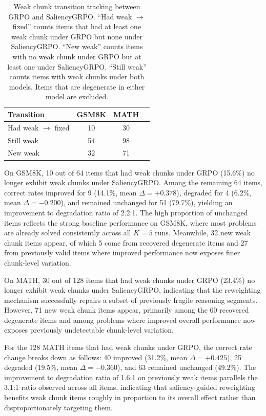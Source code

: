 \documentclass[12pt]{report}
\begin{document}
\begin{table}[htbp]
\centering
\caption{Weak chunk transition tracking between GRPO and SaliencyGRPO.  ``Had weak $\to$ fixed'' counts
items that had at least one weak chunk under GRPO but none under SaliencyGRPO.  ``New weak'' counts
items with no weak chunk under GRPO but at least one under SaliencyGRPO.  ``Still weak'' counts items
with weak chunks under both models.  Items that are degenerate in either model are excluded.}
\label{tab:weak-chunk-tracking}
\begin{tabular}{lccc}
\toprule
\textbf{Transition} & \textbf{GSM8K} & \textbf{MATH} \\
\midrule
Had weak $\to$ fixed       & 10 & 30 \\
Still weak                 & 54 & 98 \\
New weak                   & 32 & 71 \\
\bottomrule
\end{tabular}
\end{table}

On GSM8K, 10 out of 64 items that had weak chunks under GRPO (15.6\%) no longer exhibit
weak chunks under SaliencyGRPO.  Among the remaining 64 items, correct rates improved for
9 (14.1\%, mean $\Delta = +0.378$), degraded for 4 (6.2\%, mean $\Delta = -0.200$), and remained
unchanged for 51 (79.7\%), yielding an improvement to degradation ratio of 2.2:1.  The high
proportion of unchanged items reflects the strong baseline performance on GSM8K, where most
problems are already solved consistently across all $K=5$ runs.  Meanwhile, 32 new weak chunk
items appear, of which 5 come from recovered degenerate items and 27 from previously valid items
where improved performance now exposes finer chunk-level variation.

On MATH, 30 out of 128 items that had weak chunks under GRPO (23.4\%) no longer exhibit
weak chunks under SaliencyGRPO, indicating that the reweighting mechanism successfully
repairs a subset of previously fragile reasoning segments.  However, 71 new weak chunk items
appear, primarily among the 60 recovered degenerate items and among problems where improved
overall performance now exposes previously undetectable chunk-level variation.

For the 128 MATH items that had weak chunks under GRPO, the correct rate change breaks
down as follows: 40 improved (31.2\%, mean $\Delta = +0.425$), 25 degraded (19.5\%, mean
$\Delta = -0.360$), and 63 remained unchanged (49.2\%).  The improvement to degradation ratio
of 1.6:1 on previously weak items parallels the 3.1:1 ratio observed across all items, indicating
that saliency-guided reweighting benefits weak chunk items roughly in proportion to its overall effect
rather than disproportionately targeting them.
\end{document}
